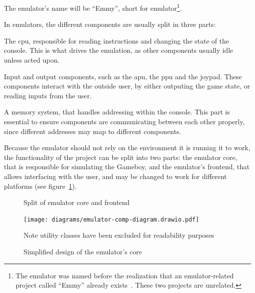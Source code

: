 \documentclass[11pt]{report}
\begin{document}
The emulator's name will be ``Emmy'', short for emulator\footnote{The emulator was named before the realization that an emulator-related project called ``Emmy'' already exists~\cite{emmy_stanford}. These two projects are unrelated.}. 

In emulators, the different components are usually split in three parts:
\begin{compactitem}
	\item The \gls{cpu}, responsible for reading instructions and changing the state of the console. This is what drives the emulation, as other components usually idle unless acted upon.
	\item Input and output components, such as the \gls{apu}, the \gls{ppu} and the joypad. These components interact with the outside user, by either outputing the game state, or reading inputs from the user.
	\item A memory system, that handles addressing within the console. This part is essential to ensure components are communicating between each other properly, since different addresses may map to different components.
\end{compactitem}

Because the emulator should not rely on the environment it is running it to work, the functionality of the project can be split into two parts: the emulator core, that is responsible for simulating the Gameboy, and the emulator's frontend, that allows interfacing with the user, and may be changed to work for different platforms (see figure~\ref{fig:emu-back-front-split-uml}).

\begin{figure}[h]
    \centering
    \caption{Split of emulator core and frontend}
    \label{fig:emu-back-front-split-uml}
\end{figure}

\begin{figure}[h]
    \centering
    \texttt{[image: diagrams/emulator-comp-diagram.drawio.pdf]}
    \caption{Simplified design of the emulator's core}
    Note utility classes have been excluded for readability purposes
    \label{fig:emu-core-components}
\end{figure}
\end{document}
